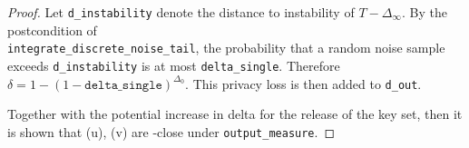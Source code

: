 \documentclass{article}
\begin{document}
\begin{proof}
Let \texttt{d\_instability} denote the distance to instability of $T - \Delta_\infty$.
By the postcondition of \\ \texttt{integrate\_discrete\_noise\_tail},
the probability that a random noise sample exceeds \texttt{d\_instability} is at most \texttt{delta\_single}.
Therefore $\delta = 1 - (1 - \texttt{delta\_single})^{\Delta_0}$.
This privacy loss is then added to \texttt{d\_out}.

Together with the potential increase in delta for the release of the key set,
then it is shown that \function(u), \function(v) are \dout-close under \texttt{output\_measure}.

\end{proof}



\end{document}
